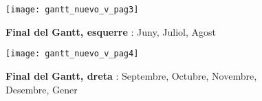 \begin{figure}[p]%
	\begin{leftfullpage}
		\texttt{[image: gantt\_nuevo\_v\_pag3]}
	\end{leftfullpage}
	\caption[Final del Gantt, esquerre]{\textbf{Final del Gantt, esquerre} : Juny, Juliol, Agost}
	\label{gantt_nuevo_v_pag3}
\end{figure}
\begin{figure}[p]%
	\begin{fullpage}
		\texttt{[image: gantt\_nuevo\_v\_pag4]}
	\end{fullpage}
	\caption[Final del Gantt, dreta]{\textbf{Final del Gantt, dreta} : Septembre, Octubre, Novembre, Desembre, Gener}
	\label{gantt_nuevo_v_pag4}
\end{figure}
  

\clearpage







